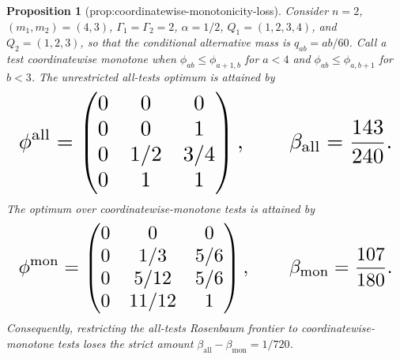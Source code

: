 \documentclass{article}
\newtheorem{proposition}{Proposition}
\begin{document}
\begin{proposition}[prop:coordinatewise-monotonicity-loss]\label{prop:coordinatewise-monotonicity-loss}
Consider \(n=2\), \((m_1,m_2)=(4,3)\), \(\Gamma_1=\Gamma_2=2\), \(\alpha=1/2\), \(Q_1=(1,2,3,4)\), and \(Q_2=(1,2,3)\), so that the conditional alternative mass is \(q_{ab}=ab/60\). Call a test coordinatewise monotone when \(\phi_{ab}\leq\phi_{a+1,b}\) for \(a<4\) and \(\phi_{ab}\leq\phi_{a,b+1}\) for \(b<3\). The unrestricted all-tests optimum is attained by
\[
\makebox[\linewidth][c]{\resizebox{0.98\linewidth}{!}{\(\displaystyle \phi^{\mathrm{all}}=\begin{pmatrix}0&0&0\\0&0&1\\0&1/2&3/4\\0&1&1\end{pmatrix},
 \qquad \beta_{\mathrm{all}}=\frac{143}{240}.\)}}
\]
The optimum over coordinatewise-monotone tests is attained by
\[
\makebox[\linewidth][c]{\resizebox{0.98\linewidth}{!}{\(\displaystyle \phi^{\mathrm{mon}}=\begin{pmatrix}0&0&0\\0&1/3&5/6\\0&5/12&5/6\\0&11/12&1\end{pmatrix},
 \qquad \beta_{\mathrm{mon}}=\frac{107}{180}.\)}}
\]
Consequently, restricting the all-tests Rosenbaum frontier to coordinatewise-monotone tests loses the strict amount \(\beta_{\mathrm{all}}-\beta_{\mathrm{mon}}=1/720\).
\end{proposition}
\end{document}
